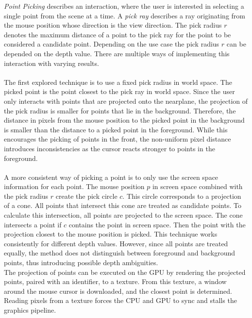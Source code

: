 \textit{Point Picking} describes an interaction, where the user is interested in selecting a single point from the scene at a time. A \textit{pick ray} describes a ray originating from the mouse position whose direction is the view direction. The pick radius $r$ denotes the maximum distance of a point to the pick ray for the point to be considered a candidate point. Depending on the use case the pick radius $r$ can be depended on the depth value. There are multiple ways of implementing this interaction with varying results. 
\\
\\
The first explored technique is to use a fixed pick radius in world space. The picked point is the point closest to the pick ray in world space. Since the user only interacts with points that are projected onto the nearplane, the projection of the pick radius is smaller for points that lie in the background. Therefore, the distance in pixels from the mouse position to the picked point in the background is smaller than the distance to a picked point in the foreground. While this encourages the picking of points in the front, the non-uniform pixel distance introduces inconsistencies as the cursor reacts stronger to points in the foreground. 
\\
\\
A more consistent way of picking a point is to only use the screen space information for each point. The mouse position $p$ in screen space combined with the pick radius $r$ create the pick circle $c$. This circle corresponds to a projection of a cone. All points that intersect this cone are treated as candidate points. To calculate this intersection, all points are projected to the screen space. The cone intersects a point if $c$ contains the point in screen space. Then the point with the projection closest to the mouse position is picked. This technique works consistently for different depth values. However, since all points are treated equally, the method does not distinguish between foreground and background points, thus introducing possible depth ambiguities. 
\\
The projection of points can be executed on the GPU by rendering the projected points, paired with an identifier, to a texture. From this texture, a window around the mouse cursor is downloaded, and the closest point is determined. Reading pixels from a texture forces the CPU and GPU to sync and stalls the graphics pipeline. 
\\ [// auch hier wären skizzen super]
\\
